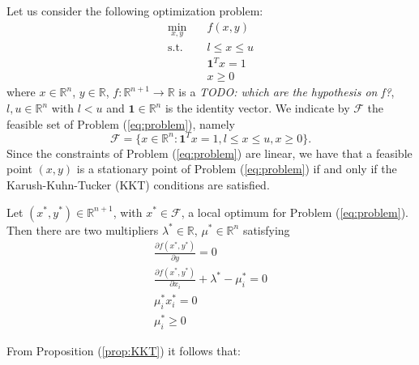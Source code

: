 Let us consider the following optimization problem:
\begin{subequations}\label{eq:problem} 
\begin{align}
\min_{x,y} & \quad f(x,y)  \\
\text{s.t.} & \quad l \leq x \leq u \\
& \quad \mathbf{1}^T x = 1 \\
& \quad x \geq 0
\end{align}
\end{subequations}
where $x \in \mathbb{R}^n$, $y \in \mathbb{R}$, $f:\mathbb{R}^{n+1} \rightarrow \mathbb{R}$ is a \textit{TODO: which are the hypothesis on f?}, $l, u \in \mathbb{R}^n$ with $l < u$ and $\mathbf{1} \in \mathbb{R}^n$ is the identity vector. We indicate by $\mathcal{F}$ the feasible set of Problem (\ref{eq:problem}), namely
\begin{equation}
\mathcal{F} = \{x \in \mathbb{R}^n : \mathbf{1}^T x = 1, l \leq x \leq u, x \geq 0 \}.
\end{equation}
Since the constraints of Problem (\ref{eq:problem}) are linear, we have that a feasible point $(x,y)$ is a stationary point of Problem (\ref{eq:problem}) if and only if the Karush-Kuhn-Tucker (KKT) conditions are satisfied.

\begin{proposition}\label{prop:KKT}
Let $(x^*,y^*) \in \mathbb{R}^{n+1}$, with $x^* \in \mathcal{F}$, a local optimum for Problem (\ref{eq:problem}). Then there are two multipliers $\lambda^* \in \mathbb{R}$, $\mu^* \in \mathbb{R}^n$ satisfying
\begin{subequations}
\begin{align}
\frac{\partial f(x^*, y^*)}{\partial y} = 0 \\
\frac{\partial f(x^*, y^*)}{\partial x_i} +\lambda^* - \mu^*_i =0 \\
\mu^*_ix^{*}_i=0 \\
\mu^*_i\ge0
\end{align}
\end{subequations}
\end{proposition}

\hspace{-1.8em} From Proposition (\ref{prop:KKT}) it follows that:


